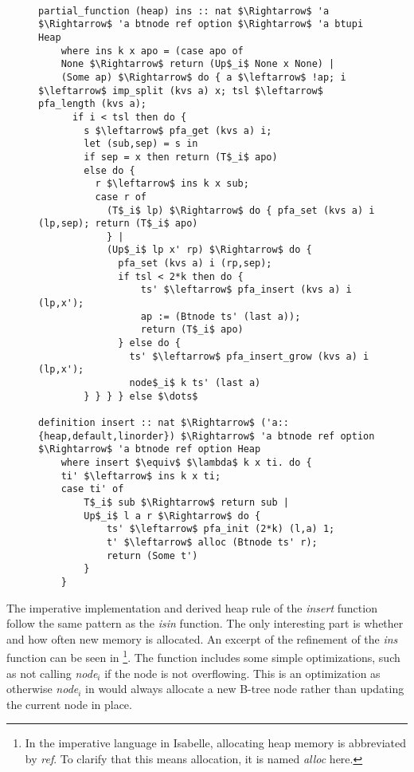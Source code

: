 \begin{figure}
\begin{lstlisting}[mathescape=true, language=Isabelle, label={lst:imp-ins-fun},
    caption={Excerpt of the imperative insert function}]

partial_function (heap) ins :: nat $\Rightarrow$ 'a $\Rightarrow$ 'a btnode ref option $\Rightarrow$ 'a btupi Heap 
    where ins k x apo = (case apo of 
    None $\Rightarrow$ return (Up$_i$ None x None) | 
    (Some ap) $\Rightarrow$ do { a $\leftarrow$ !ap; i $\leftarrow$ imp_split (kvs a) x; tsl $\leftarrow$ pfa_length (kvs a); 
      if i < tsl then do { 
        s $\leftarrow$ pfa_get (kvs a) i; 
        let (sub,sep) = s in 
        if sep = x then return (T$_i$ apo) 
        else do { 
          r $\leftarrow$ ins k x sub; 
          case r of  
            (T$_i$ lp) $\Rightarrow$ do { pfa_set (kvs a) i (lp,sep); return (T$_i$ apo) 
            } | 
            (Up$_i$ lp x' rp) $\Rightarrow$ do { 
              pfa_set (kvs a) i (rp,sep); 
              if tsl < 2*k then do { 
                  ts' $\leftarrow$ pfa_insert (kvs a) i (lp,x'); 
                  ap := (Btnode ts' (last a)); 
                  return (T$_i$ apo) 
              } else do { 
                ts' $\leftarrow$ pfa_insert_grow (kvs a) i (lp,x'); 
                node$_i$ k ts' (last a) 
        } } } } else $\dots$

definition insert :: nat $\Rightarrow$ ('a::{heap,default,linorder}) $\Rightarrow$ 'a btnode ref option $\Rightarrow$ 'a btnode ref option Heap
    where insert $\equiv$ $\lambda$ k x ti. do {
    ti' $\leftarrow$ ins k x ti;
    case ti' of
        T$_i$ sub $\Rightarrow$ return sub |
        Up$_i$ l a r $\Rightarrow$ do {
            ts' $\leftarrow$ pfa_init (2*k) (l,a) 1;
            t' $\leftarrow$ alloc (Btnode ts' r);
            return (Some t')
        }
    }

\end{lstlisting}
\end{figure}

The imperative implementation and derived heap rule of the \textit{insert} function follow
the same pattern as the \textit{isin} function.
The only interesting part is whether and how often new memory is allocated.
An excerpt of the refinement of the \textit{ins} function
can be seen in \footnote{
    In the imperative language in Isabelle, allocating heap memory
    is abbreviated by \textit{ref}.
    To clarify that this means allocation, it is named \textit{alloc} here.
}.
The function includes some simple optimizations, such as not calling
\textit{node$_i$} if the node is not overflowing.
This is an optimization as otherwise \textit{node$_i$} in
 would always allocate a new B-tree node
rather than updating the current node in place.

